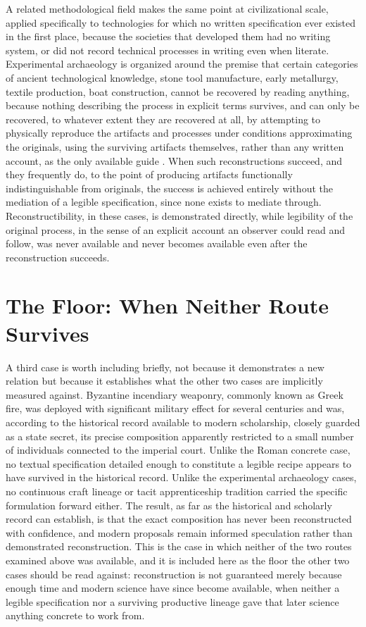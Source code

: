 \documentclass[11pt]{book}
\begin{document}
A related methodological field makes the same point at civilizational scale, applied specifically to technologies for which no written specification ever existed in the first place, because the societies that developed them had no writing system, or did not record technical processes in writing even when literate. Experimental archaeology is organized around the premise that certain categories of ancient technological knowledge, stone tool manufacture, early metallurgy, textile production, boat construction, cannot be recovered by reading anything, because nothing describing the process in explicit terms survives, and can only be recovered, to whatever extent they are recovered at all, by attempting to physically reproduce the artifacts and processes under conditions approximating the originals, using the surviving artifacts themselves, rather than any written account, as the only available guide \cite{coles1979}. When such reconstructions succeed, and they frequently do, to the point of producing artifacts functionally indistinguishable from originals, the success is achieved entirely without the mediation of a legible specification, since none exists to mediate through. Reconstructibility, in these cases, is demonstrated directly, while legibility of the original process, in the sense of an explicit account an observer could read and follow, was never available and never becomes available even after the reconstruction succeeds.

\section{The Floor: When Neither Route Survives}

A third case is worth including briefly, not because it demonstrates a new relation but because it establishes what the other two cases are implicitly measured against. Byzantine incendiary weaponry, commonly known as Greek fire, was deployed with significant military effect for several centuries and was, according to the historical record available to modern scholarship, closely guarded as a state secret, its precise composition apparently restricted to a small number of individuals connected to the imperial court. Unlike the Roman concrete case, no textual specification detailed enough to constitute a legible recipe appears to have survived in the historical record. Unlike the experimental archaeology cases, no continuous craft lineage or tacit apprenticeship tradition carried the specific formulation forward either. The result, as far as the historical and scholarly record can establish, is that the exact composition has never been reconstructed with confidence, and modern proposals remain informed speculation rather than demonstrated reconstruction. This is the case in which neither of the two routes examined above was available, and it is included here as the floor the other two cases should be read against: reconstruction is not guaranteed merely because enough time and modern science have since become available, when neither a legible specification nor a surviving productive lineage gave that later science anything concrete to work from.
\end{document}
